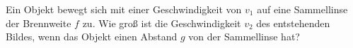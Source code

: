 \begin{Exercise}[label = movelens1, title = Bewegung auf Linse, origin = {}, difficulty = 3]
	Ein Objekt bewegt sich mit einer Geschwindigkeit von $v_1$ auf eine Sammellinse der Brennweite $f$ zu. Wie groß ist die Geschwindigkeit $v_2$ des entstehenden Bildes, wenn das Objekt einen Abstand $g$ von der Sammellinse hat?
\end{Exercise}